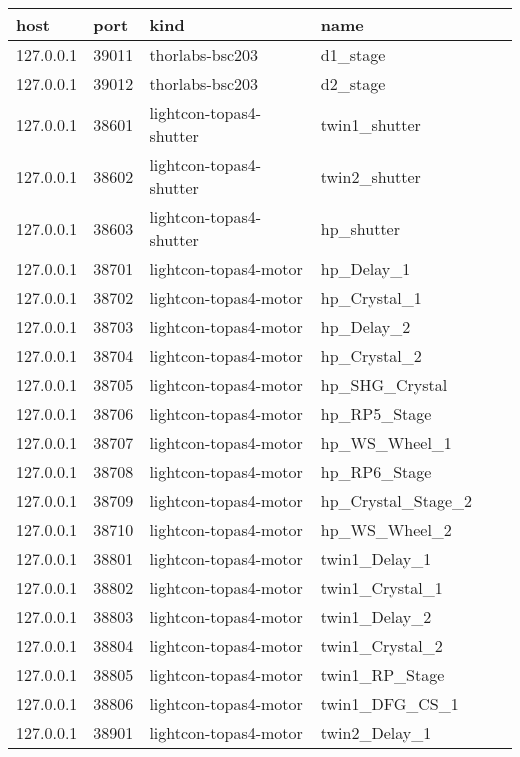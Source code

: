\begin{table}[]
\begin{tabular}{llllll}
\hline
host      & port  & kind                    & name               \\ \hline
127.0.0.1 & 39011 & thorlabs-bsc203         & d1\_stage          \\
127.0.0.1 & 39012 & thorlabs-bsc203         & d2\_stage          \\
127.0.0.1 & 38601 & lightcon-topas4-shutter & twin1\_shutter     \\
127.0.0.1 & 38602 & lightcon-topas4-shutter & twin2\_shutter     \\
127.0.0.1 & 38603 & lightcon-topas4-shutter & hp\_shutter        \\
127.0.0.1 & 38701 & lightcon-topas4-motor   & hp\_Delay\_1       \\
127.0.0.1 & 38702 & lightcon-topas4-motor   & hp\_Crystal\_1     \\
127.0.0.1 & 38703 & lightcon-topas4-motor   & hp\_Delay\_2       \\
127.0.0.1 & 38704 & lightcon-topas4-motor   & hp\_Crystal\_2     \\
127.0.0.1 & 38705 & lightcon-topas4-motor   & hp\_SHG\_Crystal   \\
127.0.0.1 & 38706 & lightcon-topas4-motor   & hp\_RP5\_Stage     \\
127.0.0.1 & 38707 & lightcon-topas4-motor   & hp\_WS\_Wheel\_1   \\
127.0.0.1 & 38708 & lightcon-topas4-motor   & hp\_RP6\_Stage     \\
127.0.0.1 & 38709 & lightcon-topas4-motor   & hp\_Crystal\_Stage\_2 \\
127.0.0.1 & 38710 & lightcon-topas4-motor   & hp\_WS\_Wheel\_2   \\
127.0.0.1 & 38801 & lightcon-topas4-motor   & twin1\_Delay\_1    \\
127.0.0.1 & 38802 & lightcon-topas4-motor   & twin1\_Crystal\_1  \\
127.0.0.1 & 38803 & lightcon-topas4-motor   & twin1\_Delay\_2    \\
127.0.0.1 & 38804 & lightcon-topas4-motor   & twin1\_Crystal\_2  \\
127.0.0.1 & 38805 & lightcon-topas4-motor   & twin1\_RP\_Stage   \\
127.0.0.1 & 38806 & lightcon-topas4-motor   & twin1\_DFG\_CS\_1  \\
127.0.0.1 & 38901 & lightcon-topas4-motor   & twin2\_Delay\_1    \\

\end{tabular}
\end{table}
